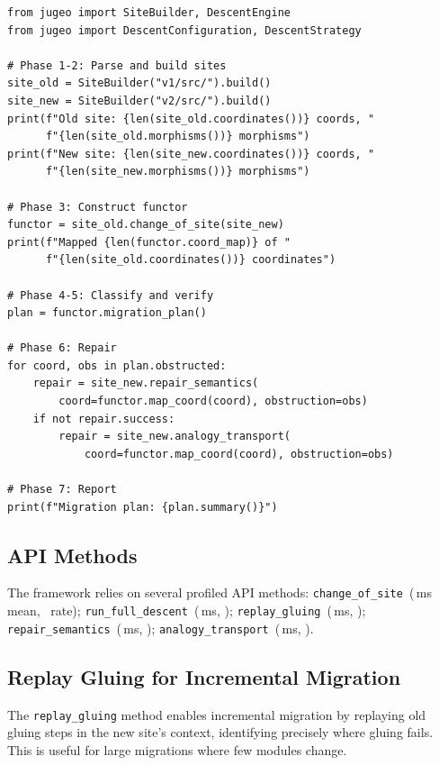 \documentclass[11pt]{article}
\newcommand{\ChangeOfSite}{\texttt{change\_of\_site}}
\newcommand{\RunDescent}{\texttt{run\_full\_descent}}
\newcommand{\ReplayGlue}{\texttt{replay\_gluing}}
\newcommand{\RepairSem}{\texttt{repair\_semantics}}
\newcommand{\AnalTrans}{\texttt{analogy\_transport}}
\begin{document}
\begin{lstlisting}[style=jugeo-python]
from jugeo import SiteBuilder, DescentEngine
from jugeo import DescentConfiguration, DescentStrategy

# Phase 1-2: Parse and build sites
site_old = SiteBuilder("v1/src/").build()
site_new = SiteBuilder("v2/src/").build()
print(f"Old site: {len(site_old.coordinates())} coords, "
      f"{len(site_old.morphisms())} morphisms")
print(f"New site: {len(site_new.coordinates())} coords, "
      f"{len(site_new.morphisms())} morphisms")

# Phase 3: Construct functor
functor = site_old.change_of_site(site_new)
print(f"Mapped {len(functor.coord_map)} of "
      f"{len(site_old.coordinates())} coordinates")

# Phase 4-5: Classify and verify
plan = functor.migration_plan()

# Phase 6: Repair
for coord, obs in plan.obstructed:
    repair = site_new.repair_semantics(
        coord=functor.map_coord(coord), obstruction=obs)
    if not repair.success:
        repair = site_new.analogy_transport(
            coord=functor.map_coord(coord), obstruction=obs)

# Phase 7: Report
print(f"Migration plan: {plan.summary()}")
\end{lstlisting}

\subsection{API Methods}
The framework relies on several profiled API methods:
\ChangeOfSite\ (\compProfChangeOfSiteMeanMs\,ms mean,
\compProfChangeOfSiteRate\ rate); \RunDescent\
(\compProfRunFullDescentMeanMs\,ms, \compProfRunFullDescentRate);
\ReplayGlue\ (\compProfReplayGluingMeanMs\,ms,
\compProfReplayGluingRate); \RepairSem\
(\compProfRepairSemanticsMeanMs\,ms, \compProfRepairSemanticsRate);
\AnalTrans\ (\compProfAnalogyTransportMeanMs\,ms,
\compProfAnalogyTransportRate).

\subsection{Replay Gluing for Incremental Migration}
The \texttt{replay\_gluing} method enables incremental migration by replaying
old gluing steps in the new site's context, identifying precisely where
gluing fails.  This is useful for large migrations where few modules change.

\end{document}

